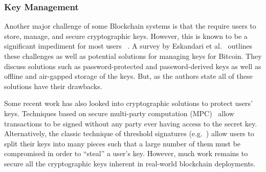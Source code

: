 %

\subsubsection{Key Management}
Another major challenge of some Blockchain systems is that the require users to store, manage, and secure cryptographic keys. However, this is known to be a significant impediment for most users ~\cite{uss:WhiTyg99}.  A survey by Eskandari et al.~\cite{arxiv:ECBS18} outlines these challenges as well as potential solutions for managing keys for Bitcoin.  They discuss solutions such as password-protected and password-derived keys as well as offline and air-gapped storage of the keys.  But, as the authors state all of these solutions have their drawbacks.

Some recent work has also looked into cryptographic solutions to protect users' keys.  Techniques based on secure multi-party computation (MPC)~\cite{CCS:LinNof18,C:Lindell17} allow transactions to be signed without any party ever having access to the secret key.  Alternatively, the classic technique of threshold signatures (e.g.~\cite{PKC:Boldyreva03,EC:GJKR96,EC:Shoup00a}) allow users to split their keys into many pieces such that a large number of them must be compromised in order to ``steal'' a user's key.  However, much work remains to secure all the cryptographic keys inherent in real-world blockchain deployments.

